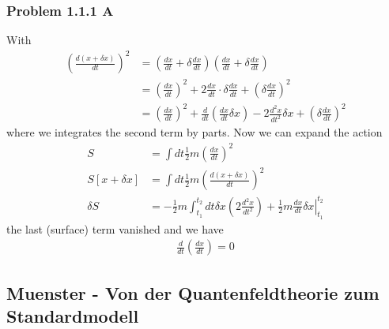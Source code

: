 \documentclass[10pt,a4paper]{article}
\theoremstyle{definition}
\begin{document}
\subsubsection{Problem 1.1.1 A}
With
\begin{align}
\left(\frac{d(x+\delta x)}{dt}\right)^2
&=\left(\frac{dx}{dt}+\delta\frac{dx}{dt}\right)\left(\frac{dx}{dt}+\delta\frac{dx}{dt}\right)\\
&=\left(\frac{dx}{dt}\right)^2+2\frac{dx}{dt}\cdot\delta\frac{dx}{dt}+\left(\delta\frac{dx}{dt}\right)^2\\
&=\left(\frac{dx}{dt}\right)^2+\frac{d}{dt}\left(\frac{dx}{dt}\delta x\right)-2\frac{d^2x}{dt^2}\delta x+\left(\delta\frac{dx}{dt}\right)^2
\end{align}
where we integrates the second term by parts. Now we can expand the action
\begin{align}
S
&=\int dt\frac{1}{2}m\left(\frac{dx}{dt}\right)^2\\
S[x+\delta x]
&=\int dt\frac{1}{2}m\left(\frac{d(x+\delta x)}{dt}\right)^2\\
\delta S&=-\frac{1}{2}m\int_{t_1}^{t_2} dt\delta x\left(2\frac{d^2x}{dt^2}\right)+\left.\frac{1}{2}m\frac{dx}{dt}\delta x\right|_{t_1}^{t_2}
\end{align}
the last (surface) term vanished and we have
\begin{align}
\frac{d}{dt}\left(\frac{dx}{dt}\right)=0
\end{align}

\subsection{{\sc Muenster} - Von der Quantenfeldtheorie zum Standardmodell} 
\end{document}
